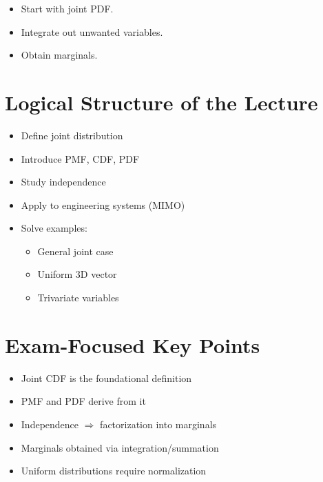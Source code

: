 \documentclass[12pt]{article}
\begin{document}
\begin{itemize}
\item Start with joint PDF.
\item Integrate out unwanted variables.
\item Obtain marginals.
\end{itemize}

\section{Logical Structure of the Lecture}

\begin{itemize}
\item Define joint distribution
\item Introduce PMF, CDF, PDF
\item Study independence
\item Apply to engineering systems (MIMO)
\item Solve examples:
\begin{itemize}
\item General joint case
\item Uniform 3D vector
\item Trivariate variables
\end{itemize}
\end{itemize}

\section{Exam-Focused Key Points}

\begin{itemize}
\item Joint CDF is the foundational definition
\item PMF and PDF derive from it
\item Independence $\Rightarrow$ factorization into marginals
\item Marginals obtained via integration/summation
\item Uniform distributions require normalization
\end{itemize}
\end{document}
